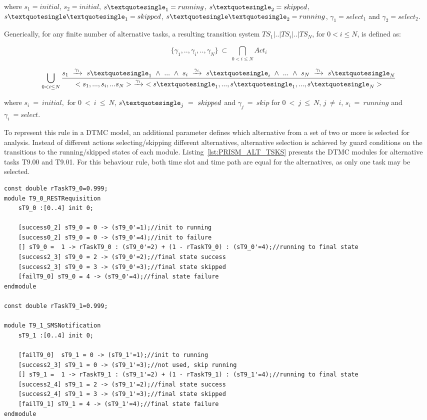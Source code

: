 \noindent
where $s_1 = initial$, $s_2 = initial$, $s\textquotesingle_1 = running$, $s\textquotesingle_2 = skipped$, $s\textquotesingle\textquotesingle_1 = skipped$, $s\textquotesingle\textquotesingle_2 = running$, $\gamma_1 = select_1$ and $\gamma_2 = select_2$. 
\medskip

Generically, for any finite number of alternative tasks, a resulting transition system $TS_1|..|TS_i|..|TS_N$, for $0 < i \leq N$, is defined as:

$$\{\gamma_1,..,\gamma_i,..,\gamma_N\}\ \subset\ \bigcap_{0 < i \leq N} Act_i$$

$$\bigcup_{0 < i \leq N} \frac{s_1\ \xrightarrow{\gamma_i}\ s\textquotesingle_1\ \wedge\ ...\ \wedge\ s_i\ \xrightarrow{\gamma_i}\ s\textquotesingle_i\ \wedge\ ...\ \wedge\ s_N\ \xrightarrow{\gamma_i}\ s\textquotesingle_N}{<s_1,...,s_i,...s_N>\ \xrightarrow{\gamma_i}\ <s\textquotesingle_1, ..., s\textquotesingle_1, ..., s\textquotesingle_N>}$$
\medskip

\noindent
where $s_i\ =\ initial,$ for $0\ <\ i\ \leq\ N$, $s\textquotesingle_j\ =\ skipped$ and $\gamma_j\ =\ skip$ for $0\ <\ j\ \leq\ N$, $j\ \neq\ i$, $s_i\ =\ running$ and $\gamma_i\ = select$.
\bigskip

To represent this rule in a DTMC model, an additional parameter  defines which alternative from a set of two or more is selected for analysis. Instead of different actions selecting/skipping different alternatives, alternative selection is achieved by guard conditions on the transitions to the running/skipped states of each module. Listing~\ref{lst:PRISM_ALT_TSKS} presents the DTMC modules for alternative tasks T9.00 and T9.01. For this behaviour rule, both time slot and time path are equal for the alternatives, as only one task may be selected.
\medskip

\begin{lstlisting}[language=Prism, caption={Alternative tasks T9.00 and T9.01 as DTMC modules with additional integer parameter used for selection.},label={lst:PRISM_ALT_TSKS}] 
const double rTaskT9_0=0.999;
module T9_0_RESTRequisition
	sT9_0 :[0..4] init 0;
	
	[success0_2] sT9_0 = 0 -> (sT9_0'=1);//init to running
	[success0_2] sT9_0 = 0 -> (sT9_0'=4);//init to failure
	[] sT9_0 =  1 -> rTaskT9_0 : (sT9_0'=2) + (1 - rTaskT9_0) : (sT9_0'=4);//running to final state
	[success2_3] sT9_0 = 2 -> (sT9_0'=2);//final state success
	[success2_3] sT9_0 = 3 -> (sT9_0'=3);//final state skipped
	[failT9_0] sT9_0 = 4 -> (sT9_0'=4);//final state failure
endmodule

const double rTaskT9_1=0.999;

module T9_1_SMSNotification
	sT9_1 :[0..4] init 0;
	
	[failT9_0]  sT9_1 = 0 -> (sT9_1'=1);//init to running
	[success2_3] sT9_1 = 0 -> (sT9_1'=3);//not used, skip running
	[] sT9_1 =  1 -> rTaskT9_1 : (sT9_1'=2) + (1 - rTaskT9_1) : (sT9_1'=4);//running to final state
	[success2_4] sT9_1 = 2 -> (sT9_1'=2);//final state success
	[success2_4] sT9_1 = 3 -> (sT9_1'=3);//final state skipped
	[failT9_1] sT9_1 = 4 -> (sT9_1'=4);//final state failure
endmodule
\end{lstlisting}

